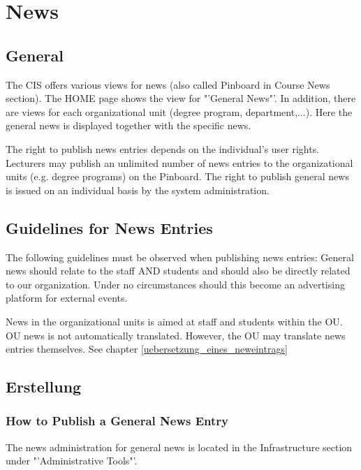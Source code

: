 \chapter{News}
\section{General}

The CIS offers various views for news (also called Pinboard in Course News section). The HOME page shows the view for "'General News"'. In addition, there are views for each organizational unit (degree program, department,...). Here the general news is displayed together with the specific news.

The right to publish news entries depends on the individual's user rights.
Lecturers may publish an unlimited number of news entries to the organizational units (e.g. degree programs) on the Pinboard.
The right to publish general news is issued on an individual basis by the system administration.

\section{Guidelines for News Entries}
\label{richtlinien_newseintraege}

The following guidelines must be observed when publishing news entries:
General news should relate to the staff AND students and should also be directly related to our organization. Under no circumstances should this become an advertising platform for external events. 


News in the organizational units is aimed at staff and students within the OU.
OU news is not automatically translated. However, the OU may translate news entries themselves.
See chapter \ref{uebersetzung_eines_neweintrags}

\section{Erstellung}

\subsection{How to Publish a General News Entry}
\label{allgemeinen_Newseintrag_erstellen}

The news administration for general news is located in the Infrastructure section under "'Administrative Tools"'.

